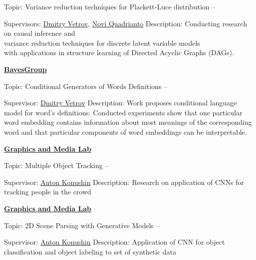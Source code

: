 \documentclass[letterpaper,MMMyyyy,nonstopmode]{simpleresumecv}
\begin{document}
\begin{Body}
\BulletItem
Topic: Variance reduction techniques for Plackett-Luce distribution
\hfill
{} --
\begin{Detail}
\SubBulletItem
Supervisors:
\href{https://bayesgroup.ru/people/dmitry-vetrov/}{Dmitry Vetrov}, \href{https://profiles.sussex.ac.uk/p335583-novi-quadrianto}{Novi Quadrianto}
\SubBulletItem
Description:
Conducting research on causal inference and\\ variance reduction techniques for discrete latent variable models\\ with applications in structure learning of Directed Acyclic Graphs (DAGs).
\end{Detail}

\Entry
\href{https://bayesgroup.ru}
{\textbf{BayesGroup}}

\Gap
\BulletItem
Topic: Conditional Generators of Words Definitions
\hfill
{} --
\begin{Detail}
\SubBulletItem
Supervisor:
\href{https://bayesgroup.ru/people/dmitry-vetrov/}{Dmitry Vetrov}
\SubBulletItem
Description:
Work proposes conditional language model for word’s definitions. \newline
Conducted experiments show that one particular word embedding contains \newline
information about most meanings of the corresponding word and that \newline
particular components of word embeddings can be interpretable.
\end{Detail}

\Entry
\href{https://graphics.cs.msu.ru}
{\textbf{Graphics and Media Lab}}

\Gap
\BulletItem
Topic: Multiple Object Tracking
\hfill
{} --
\begin{Detail}
\SubBulletItem
Supervisor:
\href{https://www.hse.ru/en/staff/akonushin}{Anton Konushin}
\SubBulletItem
Description:
Research on application of CNNs for tracking people in the crowd
\end{Detail}

\Gap

\Entry
\href{https://graphics.cs.msu.ru}
{\textbf{Graphics and Media Lab}}

\Gap
\BulletItem
Topic: 2D Scene Parsing with Generative Models
\hfill
{} --
\begin{Detail}
\SubBulletItem
Supervisor:
\href{https://www.hse.ru/en/staff/akonushin}{Anton Konushin}
\SubBulletItem
Description:
Application of CNN for object classification and object labeling to \newline
set of synthetic data
\end{Detail}


\end{Body}
\end{document}
